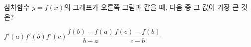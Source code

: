 \noindent\begin{minipage}[t]{0.58\linewidth}\vspace{0pt}\raggedright 삼차함수 $y=f(x)$의 그래프가 오른쪽 그림과 같을 때, 다음 중 그 값이 가장 큰 것은?\end{minipage}\hfill\begin{minipage}[t]{0.4\linewidth}\vspace{0pt}\centering \resizebox{\ifdim\width>\linewidth\linewidth\else\width\fi}{!}{}\end{minipage}\par
\begin{choicesv}{$f'(a)$}{$f'(b)$}{$f'(c)$}{$\dfrac{f(b)-f(a)}{b-a}$}{$\dfrac{f(c)-f(b)}{c-b}$}\end{choicesv}
